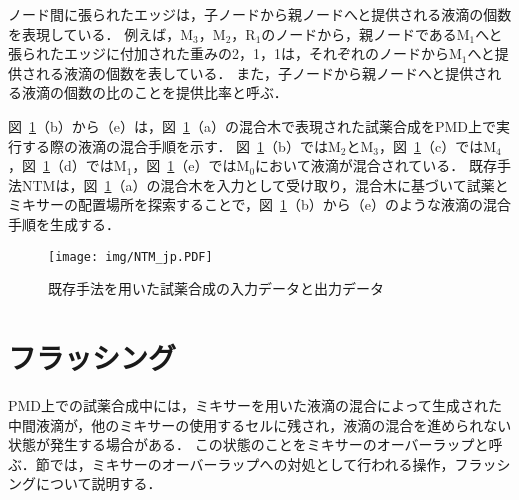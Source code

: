 ノード間に張られたエッジは，子ノードから親ノードへと提供される液滴の個数を表現している．
例えば，M$_3$，M$_2$，R$_1$のノードから，親ノードであるM$_1$へと張られたエッジに付加された重みの2，1，1は，それぞれのノードからM$_1$へと提供される液滴の個数を表している．
また，子ノードから親ノードへと提供される液滴の個数の比のことを提供比率と呼ぶ．

図~\ref{fig:NTM}（b）から（e）は，図~\ref{fig:NTM}（a）の混合木で表現された試薬合成をPMD上で実行する際の液滴の混合手順を示す．
図~\ref{fig:NTM}（b）ではM$_2$とM$_3$，図~\ref{fig:NTM}（c）ではM$_4$，図~\ref{fig:NTM}（d）ではM$_1$，図~\ref{fig:NTM}（e）ではM$_0$において液滴が混合されている．
既存手法NTMは，図~\ref{fig:NTM}（a）の混合木を入力として受け取り，混合木に基づいて試薬とミキサーの配置場所を探索することで，図~\ref{fig:NTM}（b）から（e）のような液滴の混合手順を生成する．

\begin{figure}[tbp]
    \centering\texttt{[image: img/NTM\_jp.PDF]}
    \caption{既存手法を用いた試薬合成の入力データと出力データ}\label{fig:NTM}
\end{figure}


\section{フラッシング}
\label{sec:flushing}
    PMD上での試薬合成中には，ミキサーを用いた液滴の混合によって生成された中間液滴が，他のミキサーの使用するセルに残され，液滴の混合を進められない状態が発生する場合がある．
    この状態のことをミキサーのオーバーラップと呼ぶ．節では，ミキサーのオーバーラップへの対処として行われる操作，フラッシングについて説明する．
    
